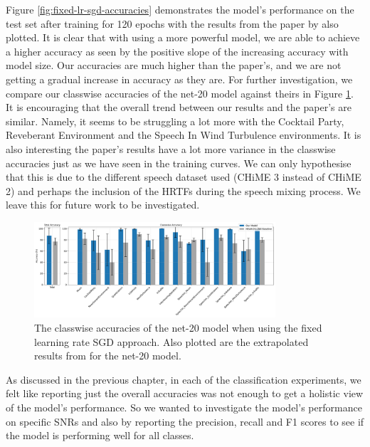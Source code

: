\documentclass[logo,bsc,singlespacing,parskip,online]{infthesis}
\begin{document}
Figure \ref{fig:fixed-lr-sgd-accuracies} demonstrates the model's performance on the test set after training for 120 epochs 
with the results from the paper by \citet{Huwel2020HearDS} also plotted. It is clear 
that with using a more powerful model, we are able to achieve a higher accuracy 
as seen by the positive slope of the increasing accuracy with model size.
Our accuracies are much higher than the paper's, and we are not getting a gradual 
increase in accuracy as they are. For further investigation, we 
compare our classwise accuracies of the net-20 model against theirs in Figure 
\ref{fig:fixed-lr-sgd-classwise-accuracies}. It is encouraging 
that the overall trend between our results and the paper's are similar. 
Namely, it seems to be struggling a lot more with the Cocktail Party, Reveberant 
Environment and the Speech In Wind Turbulence environments.
It is also interesting the paper's results have a lot more variance in the classwise accuracies 
just as we have seen in the training curves. We can only hypothesise 
that this is due to the different speech dataset used (CHiME 3 instead of CHiME 2) 
and perhaps the inclusion of the HRTFs during the speech mixing process. We leave 
this for future work to be investigated.

\begin{figure}[h]
   \centering
   \includegraphics[width=0.8\textwidth]{net-20/FIXED-fixed-lr-sgd/classwise_accuracies.png}
   \caption{The classwise accuracies of the net-20 model when using the fixed learning rate SGD approach.
   Also plotted are the extrapolated results from \citet{Huwel2020HearDS} for the net-20 model.}
   \label{fig:fixed-lr-sgd-classwise-accuracies}
\end{figure}   

As discussed in the previous chapter, in each of the classification experiments, we felt like reporting just the overall 
accuracies was not enough to get a holistic view of the model's performance. 
So we wanted to investigate the model's performance on specific SNRs and also by reporting the precision, recall and F1 scores to
see if the model is performing well for all classes. 
\end{document}
